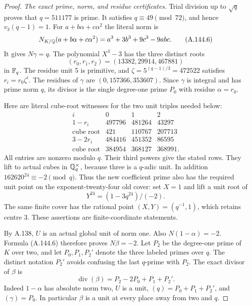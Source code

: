 \begin{proof}
\emph{The exact prime, norm, and residue certificates.}
Trial division up to \(\sqrt q\) proves that
\(q=511177\) is prime.
It satisfies \(q\equiv49\pmod{72}\), and hence
\(v_3(q-1)=1\).
For \(a+b\alpha+c\alpha^2\) the literal norm is
\[
 N_{K/\mathbb Q}(a+b\alpha+c\alpha^2)
                  =a^3+3b^3+9c^3-9abc .
\tag{A.144.6}
\]
It gives \(N\gamma=q\).
The polynomial \(X^3-3\) has the three distinct
roots
\[
                         (r_0,r_1,r_2)=(13382,29914,467881)
\tag{A.144.7}
\]
in \(\mathbb F_q\).
The residue unit 5 is primitive, and
\(\zeta=5^{(q-1)/3}=472522\) satisfies
\(r_i=r_0\zeta^i\).
The residues of \(\gamma\) are
\((0,157366,353607)\).
Since \(\gamma\) is integral and has prime norm
\(q\), its divisor is the single degree-one
prime \(P_0\) with residue \(\alpha=r_0\).

Here are literal cube-root witnesses for the
two unit triples needed below:
\[
 \begin{array}{c|rrr}
 i&0&1&2\\ \hline
 1-r_i&497796&481264&43297\\
 \text{cube root}&421&110767&207713\\
 3-2r_i&484416&451352&86595\\
 \text{cube root}&384954&368127&368991 .
 \end{array}
\tag{A.144.8}
\]
All entries are nonzero modulo \(q\).
Their third powers give the stated rows.
They lift to actual cubes in \(\mathbb Q_q^\times\),
because three is a \(q\)-adic unit.
In addition \(162620^{24}\equiv-2\pmod q\).
Thus the new coefficient prime also has
the required unit point on the exponent-twenty-four
old cover: set \(X=1\) and lift a unit root of
\[
                         Y^{24}=(1-3q^{24})/(-2).
\tag{A.144.9}
\]
The same finite cover has the rational point
\((X,Y)=(q^{-1},1)\), which retains centre \(3\).
These assertions are finite-coordinate statements.

By A.138, \(U\) is an actual global unit of
norm one.
Also \(N(1-\alpha)=-2\).
Formula (A.144.6) therefore proves
\(N\beta=-2\).
Let \(P_2\) be the degree-one prime of \(K\)
over two, and let \(P_0,P_1,P_2'\) denote
the three labeled primes over \(q\).
The distinct notation \(P_2'\) avoids
confusing the last \(q\)-prime with \(P_2\).
The exact divisor of \(\beta\) is
\[
             \operatorname{div}(\beta)
                         =P_2-2P_0+P_1+P_2'.
\tag{A.144.10}
\]
Indeed \(1-\alpha\) has absolute norm two,
\(U\) is a unit, \((q)=P_0+P_1+P_2'\),
and \((\gamma)=P_0\).
In particular \(\beta\) is a unit at every
place away from two and \(q\).


\end{proof}
